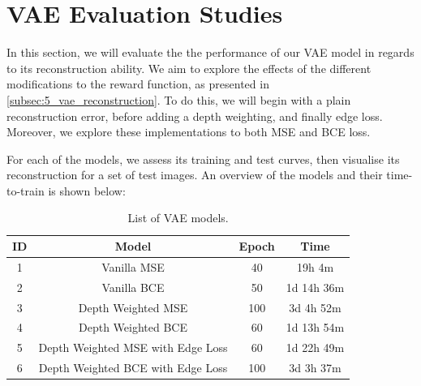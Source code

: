 \chapter{VAE Evaluation Studies}
\label{chap:8_vae_evaluation_studies}
In this section, we will evaluate the the performance of our VAE model in regards to its reconstruction ability. We aim to explore the effects of the different modifications to the reward function, as presented in \cref{subsec:5_vae_reconstruction}. To do this, we will begin with a plain reconstruction error, before adding a depth weighting, and finally edge loss.
Moreover, we explore these implementations to both MSE and BCE loss.

For each of the models, we assess its training and test curves, then visualise its reconstruction for a set of test images.
An overview of the models and their time-to-train is shown below:
\begin{table}[hbt]
    \centering
    \begin{tabular}{||c|c|c|c||}
    \hline
        ID & Model & Epoch & Time \\
    \hline\hline
        1 & Vanilla MSE & 40 & 19h 4m \\\hline
        2 & Vanilla BCE & 50 & 1d 14h 36m \\\hline
        3 & Depth Weighted MSE & 100 & 3d 4h 52m \\\hline
        4 & Depth Weighted BCE & 60 &  1d 13h 54m \\\hline
        5 & Depth Weighted MSE with Edge Loss & 60 & 1d 22h 49m \\\hline
        6 & Depth Weighted BCE with Edge Loss & 100 & 3d 3h 37m \\
    \hline
    \end{tabular}
    \caption{List of VAE models.}
    \label{tab:8_all_vae_models}
\end{table}

